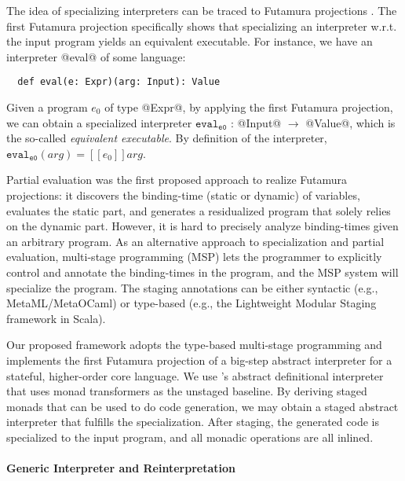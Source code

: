 The idea of specializing interpreters can be traced to Futamura
projections \cite{Futamura1999, futamura1971partial}.
The first Futamura projection specifically shows that
specializing an interpreter w.r.t. the input program yields an
equivalent executable.  For instance, we have an interpreter @eval@ of
some language:
\begin{lstlisting}
  def eval(e: Expr)(arg: Input): Value
\end{lstlisting}
Given a program $e_0$ of type @Expr@, by applying the first Futamura
projection, we can obtain a specialized interpreter
$\texttt{eval}_{\texttt{e0}}$ : @Input@ $\to$ @Value@, which is the so-called
\textit{equivalent executable}. By definition of the interpreter,
$\texttt{eval}_{\texttt{e0}}(arg) = [\![ e_0 ]\!] arg $.

Partial evaluation \cite{DBLP:books/daglib/0072559} was the first
proposed approach to realize Futamura projections: it discovers the
binding-time (static or dynamic) of variables, evaluates the static
part, and generates a residualized program that solely relies on the dynamic
part. However, it is hard to precisely analyze binding-times given an
arbitrary program. As an alternative approach to specialization and
partial evaluation, multi-stage programming (MSP) \cite{taha1999multi, DBLP:conf/pepm/TahaS97}
lets the programmer to explicitly control and annotate the
binding-times in the program, and the MSP system will specialize the
program. The staging annotations can be either syntactic (e.g.,
MetaML/MetaOCaml) or type-based (e.g., the Lightweight Modular Staging framework
\cite{DBLP:conf/gpce/RompfO10} in Scala).

Our proposed framework adopts the type-based multi-stage programming
and implements the first Futamura projection of a big-step abstract
interpreter for a stateful, higher-order core language.  We use
\citet{DBLP:journals/pacmpl/DaraisLNH17}'s abstract definitional
interpreter that uses monad transformers as the unstaged baseline. By
deriving staged monads that can be used to do code generation, we may
obtain a staged abstract interpreter that fulfills the specialization.
After staging, the generated code is specialized to the input program,
and all monadic operations are all inlined.



\paragraph{Generic Interpreter and Reinterpretation}


